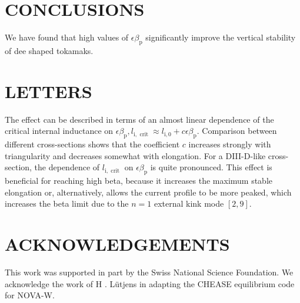 \documentclass[10pt]{article}
\begin{document}
\section{CONCLUSIONS}
We have found that high values of $\epsilon \beta_{\mathrm{p}}$ significantly improve the vertical stability of dee shaped tokamaks.

\section{LETTERS}
The effect can be described in terms of an almost linear dependence of the critical internal inductance on $\epsilon \beta_{\mathrm{p}}, l_{\mathrm{i}, \text { crit }} \approx l_{\mathrm{i}, 0}+c \epsilon \beta_{\mathrm{p}}$. Comparison between different cross-sections shows that the coefficient $c$ increases strongly with triangularity and decreases somewhat with elongation. For a DIII-D-like cross-section, the dependence of $l_{\mathrm{i}, \text { crit }}$ on $\epsilon \beta_{\mathrm{p}}$ is quite pronounced. This effect is beneficial for reaching high beta, because it increases the maximum stable elongation or, alternatively, allows the current profile to be more peaked, which increases the beta limit due to the $n=1$ external kink mode $[2,9]$.

\section{ACKNOWLEDGEMENTS}
This work was supported in part by the Swiss National Science Foundation. We acknowledge the work of H . Lütjens in adapting the CHEASE equilibrium code for NOVA-W.
\end{document}
